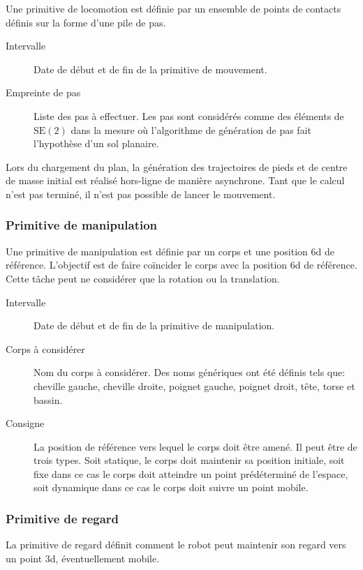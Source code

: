 Une primitive de locomotion est définie par un ensemble de points de
contacts définis sur la forme d'une pile de pas.

\begin{description}
\item[Intervalle] Date de début et de fin de la primitive de mouvement.
\item[Empreinte de pas] Liste des pas à effectuer. Les pas sont
  considérés comme des éléments de $\text{SE}(2)$ dans la mesure où
  l'algorithme de génération de pas fait l'hypothèse d'un sol
  planaire.
\end{description}

Lors du chargement du plan, la génération des trajectoires de pieds et
de centre de masse initial est réalisé hors-ligne de manière
asynchrone. Tant que le calcul n'est pas terminé, il n'est pas
possible de lancer le mouvement.


\subsubsection{Primitive de manipulation}

Une primitive de manipulation est définie par un corps et une position
6d de référence. L'objectif est de faire coïncider le corps avec la
position 6d de référence. Cette tâche peut ne considérer que la
rotation ou la translation.

\begin{description}
\item[Intervalle] Date de début et de fin de la primitive de manipulation.
\item[Corps à considérer] Nom du corps à considérer. Des noms
  génériques ont été définis tels que: cheville gauche, cheville
  droite, poignet gauche, poignet droit, tête, torse et bassin.
\item[Consigne] La position de référence vers lequel le corps doit
  être amené. Il peut être de trois types. Soit statique, le corps
  doit maintenir sa position initiale, soit fixe dans ce cas le corps
  doit atteindre un point prédéterminé de l'espace, soit dynamique
  dans ce cas le corps doit suivre un point mobile.
\end{description}


\subsubsection{Primitive de regard}

La primitive de regard définit comment le robot peut maintenir son
regard vers un point 3d, éventuellement mobile.

